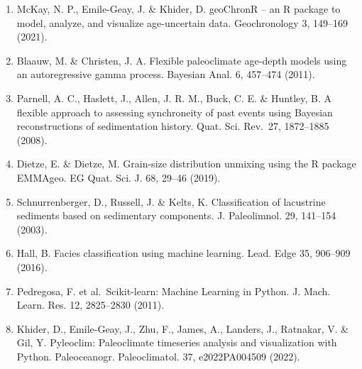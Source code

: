 \documentclass[
]{article}
\begin{document}
\begin{enumerate}
  Years cal BP. Radiocarbon 62, 759--778 (2020).
\item
  McKay, N. P., Emile-Geay, J. \& Khider, D. geoChronR -- an R package
  to model, analyze, and visualize age-uncertain data. Geochronology 3,
  149--169 (2021).
\item
  Blaauw, M. \& Christen, J. A. Flexible paleoclimate age-depth models
  using an autoregressive gamma process. Bayesian Anal. 6, 457--474
  (2011).
\item
  Parnell, A. C., Haslett, J., Allen, J. R. M., Buck, C. E. \& Huntley,
  B. A flexible approach to assessing synchroneity of past events using
  Bayesian reconstructions of sedimentation history. Quat. Sci. Rev.~27,
  1872--1885 (2008).
\item
  Dietze, E. \& Dietze, M. Grain-size distribution unmixing using the R
  package EMMAgeo. EG Quat. Sci. J. 68, 29--46 (2019).
\item
  Schnurrenberger, D., Russell, J. \& Kelts, K. Classification of
  lacustrine sediments based on sedimentary components. J. Paleolimnol.
  29, 141--154 (2003).
\item
  Hall, B. Facies classification using machine learning. Lead. Edge 35,
  906--909 (2016).
\item
  Pedregosa, F. et al.~Scikit-learn: Machine Learning in Python. J.
  Mach. Learn. Res. 12, 2825--2830 (2011).
\item
  Khider, D., Emile-Geay, J., Zhu, F., James, A., Landers, J., Ratnakar,
  V. \& Gil, Y. Pyleoclim: Paleoclimate timeseries analysis and
  visualization with Python. Paleoceanogr. Paleoclimatol. 37,
  e2022PA004509 (2022).
\end{enumerate}

\clearpage
\end{document}
